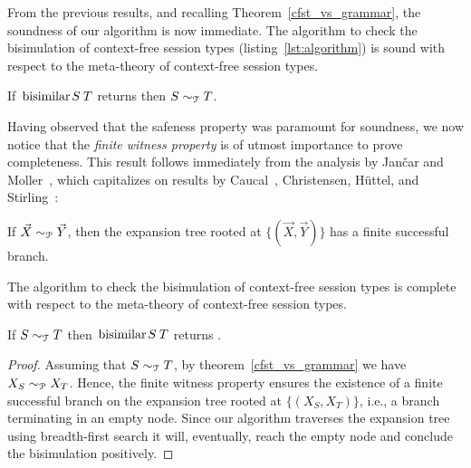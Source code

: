 From the previous results, and recalling
Theorem~\ref{cfst_vs_grammar}, the soundness of our algorithm is now
immediate.  The algorithm to check the bisimulation of context-free
session types (listing~\ref{lst:algorithm}) is sound with respect to
the meta-theory of context-free session types.

\begin{theorem}
  If $\bisimf ST$ returns  then $S\sim_\mathcal T T$.
\end{theorem}

Having observed that the safeness property was paramount for
soundness, we now notice that the \emph{finite witness property} is of
utmost importance to prove completeness. This result follows
immediately from the analysis by Jan{\v{c}}ar and
Moller~\cite{janvcar1999techniques}, which capitalizes on results by
Caucal~\cite{caucal1986decidabilite}, Christensen, H{\"{u}}ttel, and
Stirling~\cite{DBLP:journals/iandc/ChristensenHS95}:

\begin{proposition} 
\label{finite_witness}
	If $\vec X \sim_\mathcal P \vec Y$, then the expansion tree rooted at
	$\{(\vec X, \vec Y)\}$ has a finite successful branch.
\end{proposition}

The algorithm to check the bisimulation of context-free session types
is complete with respect to the meta-theory of context-free session
types.

\begin{theorem}
  If $S \sim_\mathcal T T$ then $\bisimf S T$ returns
  .
\end{theorem}

\begin{proof}
  Assuming that $S \sim_\mathcal T T$, by theorem~\ref{cfst_vs_grammar} we
  have $X_{S} \sim_\mathcal P X_{T}$.  Hence, the finite witness property
  ensures the existence of a finite successful branch on the expansion
  tree rooted at $\{(X_{S},X_{T})\}$, i.e., a branch terminating in an
  empty node.  Since our algorithm traverses the expansion tree using
  breadth-first search it will, eventually, reach the empty node and
  conclude the bisimulation positively.
\end{proof}

